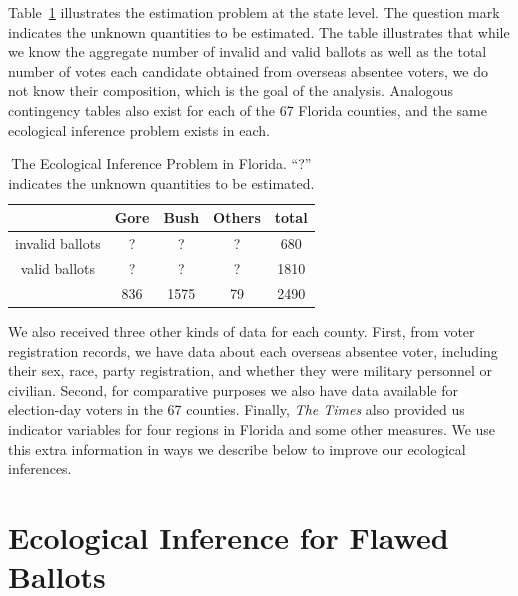 \documentclass[11pt,titlepage]{article}
\begin{document}
Table~\ref{tb:ballots} illustrates the estimation problem at the state
level. The question mark indicates the unknown quantities to be
estimated.  The table illustrates that while we know the aggregate
number of invalid and valid ballots as well as the total number of
votes each candidate obtained from overseas absentee voters, we do not
know their composition, which is the goal of the analysis.  Analogous
contingency tables also exist for each of the 67 Florida counties, and
the same ecological inference problem exists in each.
\begin{table}[t]
  \begin{center}
    \begin{tabular}{ccccc}
      & Gore  & Bush & Others & total  \\
      \hline 
      invalid ballots &   ?   &   ?  &   ?    &  680   \\
      valid ballots   &   ?   &   ?  &   ?    & 1810   \\
      \hline
      & 836   & 1575 &   79   & 2490   \\
    \end{tabular} \caption{The Ecological Inference Problem in Florida.  
      ``?'' indicates the unknown quantities to be
      estimated.}\label{tb:ballots}
  \end{center}
\end{table} 

We also received three other kinds of data for each county.  First,
from voter registration records, we have data about each overseas
absentee voter, including their sex, race, party registration, and
whether they were military personnel or civilian.  Second, for
comparative purposes we also have data available for election-day
voters in the 67 counties.  Finally, \emph{The Times} also provided us
indicator variables for four regions in Florida and some other
measures.  We use this extra information in ways we describe below to
improve our ecological inferences.

\section{Ecological Inference for Flawed Ballots} \label{s:ecinf}
\end{document}
